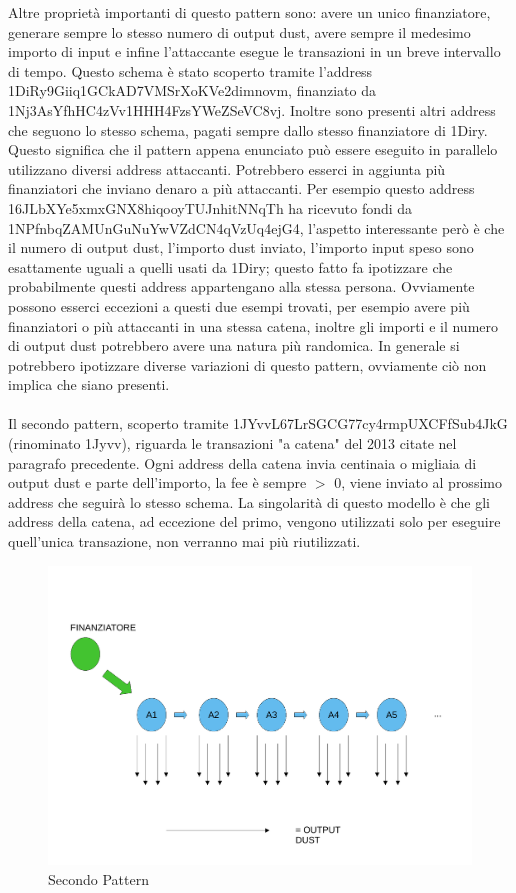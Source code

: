 Altre proprietà importanti di questo pattern sono: avere un unico finanziatore, generare sempre lo stesso numero di output dust, avere sempre il medesimo importo di input e infine l'attaccante esegue le transazioni in un breve intervallo di tempo. Questo schema è stato scoperto tramite l'address 1DiRy9Giiq1GCkAD7VMSrXoKVe2dimnovm, finanziato da 1Nj3AsYfhHC4zVv1HHH4FzsYWeZSeVC8vj. Inoltre sono presenti altri address che seguono lo stesso schema, pagati sempre dallo stesso finanziatore di 1Diry. Questo significa che il pattern appena enunciato può essere eseguito in parallelo utilizzano diversi address attaccanti. Potrebbero esserci in aggiunta più finanziatori che inviano denaro a più attaccanti. Per esempio questo address 16JLbXYe5xmxGNX8hiqooyTUJnhitNNqTh ha ricevuto fondi da 1NPfnbqZAMUnGuNuYwVZdCN4qVzUq4ejG4, l'aspetto interessante però è che il numero di output dust, l'importo dust inviato, l'importo input speso sono esattamente uguali a quelli usati da 1Diry; questo fatto fa ipotizzare che probabilmente questi address appartengano alla stessa persona. Ovviamente possono esserci eccezioni a questi due esempi trovati, per esempio avere più finanziatori o più attaccanti in una stessa catena, inoltre gli importi e il numero di output dust potrebbero avere una natura più randomica. In generale si potrebbero ipotizzare diverse variazioni di questo pattern, ovviamente ciò non implica che siano presenti.\\\\
Il secondo pattern, scoperto tramite 1JYvvL67LrSGCG77cy4rmpUXCFfSub4JkG (rinominato 1Jyvv), riguarda le transazioni "a catena" del 2013 citate nel paragrafo precedente. Ogni address della catena invia centinaia o migliaia di output dust e parte dell'importo, la fee è sempre $>$ 0, viene inviato al prossimo address che seguirà lo stesso schema. La singolarità di questo modello è che gli address della catena, ad eccezione del primo, vengono utilizzati solo per eseguire quell'unica transazione, non verranno mai più riutilizzati.
\begin{figure}[h!]
    \centering
    \includegraphics[scale=0.4]{Images/dust_attack2.pdf}
    \caption{Secondo Pattern}
    \label{fig:schema2}
\end{figure}
